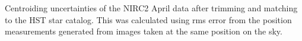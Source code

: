 Centroiding uncertainties of the NIRC2 April data after trimming and matching to the HST star catalog.  This was calculated using rms error from the position measurements generated from images taken at the same position on the sky. \label{cent_precision}